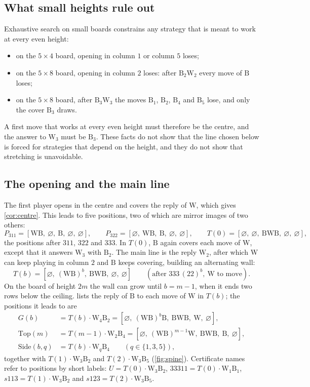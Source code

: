 \documentclass[11pt,a4paper]{article}
\theoremstyle{plain}
\theoremstyle{definition}
\newcommand{\B}{\mathrm{B}}
\newcommand{\W}{\mathrm{W}}
\newcommand{\col}[1]{[#1]}
\newcommand{\Top}{\mathrm{Top}}
\newcommand{\Side}{\mathrm{Side}}
\begin{document}
\subsection{What small heights rule out}
\label{sec:counterexamples}

Exhaustive search on small boards constrains any strategy that is meant to work at every even height:
\begin{itemize}
  \item on the $5\times 4$ board, opening in column $1$ or column $5$ loses;
  \item on the $5\times 8$ board, opening in column $2$ loses: after $\B_2\W_2$ every move of $\B$ loses;
  \item on the $5\times 8$ board, after $\B_3\W_3$ the moves $\B_1$, $\B_2$, $\B_4$ and $\B_5$ lose, and only the cover $\B_3$ draws.
\end{itemize}
A first move that works at every even height must therefore be the centre, and the answer to $\W_3$ must be $\B_3$. These facts do not show that the line chosen below is forced for strategies that depend on the height, and they do not show that stretching is unavoidable.

\subsection{The opening and the main line}

The first player opens in the centre and covers the reply of $\W$, which gives \cref{cor:centre}. This leads to five positions, two of which are mirror images of two others:
\[
  P_{311}=\col{\W\B,\ \varnothing,\ \B,\ \varnothing,\ \varnothing},\qquad
  P_{322}=\col{\varnothing,\ \W\B,\ \B,\ \varnothing,\ \varnothing},\qquad
  T(0)=\col{\varnothing,\ \varnothing,\ \B\W\B,\ \varnothing,\ \varnothing},
\]
the positions after $311$, $322$ and $333$. In $T(0)$, $\B$ again covers each move of $\W$, except that it answers $\W_3$ with $\B_2$. The main line is the reply $\W_2$, after which $\W$ can keep playing in column $2$ and $\B$ keeps covering, building an alternating wall:
\[
  T(b)=\col{\varnothing,\ (\W\B)^b,\ \B\W\B,\ \varnothing,\ \varnothing}\qquad(\text{after } 333\,(22)^b,\ \W\text{ to move}).
\]
On the board of height $2m$ the wall can grow until $b=m-1$, when it ends two rows below the ceiling.  lists the reply of $\B$ to each move of $\W$ in $T(b)$; the positions it leads to are
\begin{align*}
  G(b) &= T(b)\cdot\W_4\B_2 = \col{\varnothing,\ (\W\B)^b\B,\ \B\W\B,\ \W,\ \varnothing},\\
  \Top(m) &= T(m-1)\cdot\W_2\B_4 = \col{\varnothing,\ (\W\B)^{m-1}\W,\ \B\W\B,\ \B,\ \varnothing},\\
  \Side(b,q) &= T(b)\cdot\W_q\B_4\qquad (q\in\{1,3,5\}),
\end{align*}
together with $T(1)\cdot\W_3\B_2$ and $T(2)\cdot\W_3\B_5$ (\cref{fig:spine}). Certificate names refer to positions by short labels: $U=T(0)\cdot\W_3\B_2$, $33311=T(0)\cdot\W_1\B_1$, $s113=T(1)\cdot\W_3\B_2$ and $s123=T(2)\cdot\W_3\B_5$.
\end{document}

